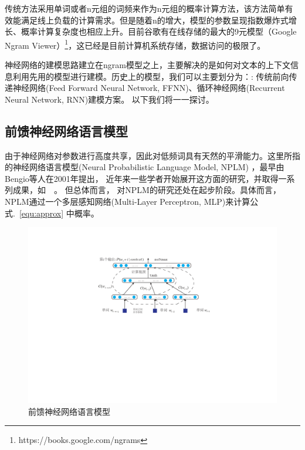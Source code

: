 传统方法采用单词或者n元组的词频来作为n元组的概率计算方法，该方法简单有效能满足线上负载的计算需求。但是随着n的增大，模型的参数呈现指数爆炸式增长、概率计算复杂度也相应上升。目前谷歌有在线存储的最大的9元模型（Google Ngram Viewer）\footnote{https://books.google.com/ngrams}，这已经是目前计算机系统存储，数据访问的极限了。


神经网络的建模思路建立在ngram模型之上，主要解决的是如何对文本的上下文信息利用先用的模型进行建模。历史上的模型，我们可以主要划分为：: 传统前向传递神经网络(Feed Forward Neural Network, FFNN)、循环神经网络(Recurrent Neural Network, RNN)建模方案。 以下我们将一一探讨。


\subsection{前馈神经网络语言模型}
由于神经网络对参数进行高度共享，因此对低频词具有天然的平滑能力。这里所指的神经网络语言模型(Neural Probabilistic Language Model, NPLM) ，最早由Bengio等人在2001年提出， 近年来一些学者开始展开这方面的研究，并取得一系列成果，如~\cite{DBLP:conf/acl/BaroniDK14,DBLP:journals/sigkdd/BellK07,DBLP:journals/pami/BengioCV13,DBLP:journals/tnn/BengioSF94}~。 但总体而言， 对NPLM的研究还处在起步阶段。具体而言，NPLM通过一个多层感知网络(Multi-Layer Perceptron, MLP)来计算公式.~\ref{equ:approx} 中概率。
\begin{figure}
  \centering
  \includegraphics[width=0.79\linewidth]{./figures/nplm.pdf}
  \caption{前馈神经网络语言模型}\label{fig:nplm}
\end{figure}

